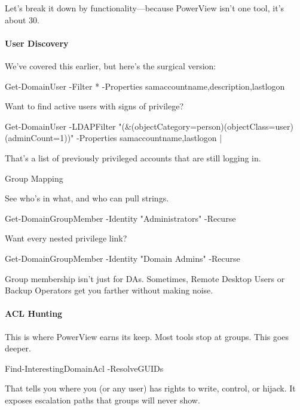 Let’s break it down by functionality—because PowerView isn’t one tool, it’s about 30.

\paragraph{   User Discovery}

We’ve covered this earlier, but here’s the surgical version:

 

 

Get-DomainUser -Filter * -Properties samaccountname,description,lastlogon

Want to find active users with signs of privilege?

 

 

Get-DomainUser -LDAPFilter "(\&(objectCategory=person)(objectClass=user)(adminCount=1))" -Properties samaccountname,lastlogon |

That’s a list of previously privileged accounts that are still logging in.

Group Mapping

See who’s in what, and who can pull strings.

 

 

Get-DomainGroupMember -Identity "Administrators" -Recurse

Want every nested privilege link?

 

 

Get-DomainGroupMember -Identity "Domain Admins" -Recurse

Group membership isn’t just for DAs. Sometimes, Remote Desktop Users or Backup Operators get you farther without making noise.

\paragraph{   ACL Hunting}

This is where PowerView earns its keep. Most tools stop at groups. This goes deeper.

 

 

Find-InterestingDomainAcl -ResolveGUIDs

That tells you where you (or any user) has rights to write, control, or hijack. It exposes escalation paths that groups will never show.

